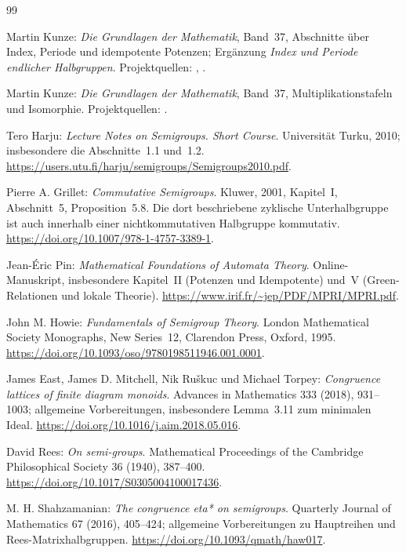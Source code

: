 \renewcommand{\bibname}{Quellen und Anschlüsse im Projekt}
\begin{thebibliography}{99}
\small
{}
Martin Kunze: \emph{Die Grundlagen der Mathematik}, Band~37,
Abschnitte über Index, Periode und idempotente Potenzen;
Ergänzung \emph{Index und Periode endlicher Halbgruppen}.
Projektquellen: ,
.

Martin Kunze: \emph{Die Grundlagen der Mathematik}, Band~37,
Multiplikationstafeln und Isomorphie.
Projektquellen: .

Tero Harju: \emph{Lecture Notes on Semigroups. Short Course}.
Universität Turku, 2010; insbesondere die Abschnitte~1.1 und~1.2.
\url{https://users.utu.fi/harju/semigroups/Semigroups2010.pdf}.

Pierre A. Grillet: \emph{Commutative Semigroups}.
Kluwer, 2001, Kapitel~I, Abschnitt~5, Proposition~5.8.
Die dort beschriebene zyklische Unterhalbgruppe ist auch innerhalb
einer nichtkommutativen Halbgruppe kommutativ.
\url{https://doi.org/10.1007/978-1-4757-3389-1}.

Jean-Éric Pin: \emph{Mathematical Foundations of Automata Theory}.
Online-Manuskript, insbesondere Kapitel~II (Potenzen und Idempotente)
und~V (Green-Relationen und lokale Theorie).
\url{https://www.irif.fr/~jep/PDF/MPRI/MPRI.pdf}.

John M. Howie: \emph{Fundamentals of Semigroup Theory}.
London Mathematical Society Monographs, New Series~12,
Clarendon Press, Oxford, 1995.
\url{https://doi.org/10.1093/oso/9780198511946.001.0001}.

James East, James D. Mitchell, Nik Ruškuc und Michael Torpey:
\emph{Congruence lattices of finite diagram monoids}.
Advances in Mathematics 333 (2018), 931--1003;
allgemeine Vorbereitungen, insbesondere Lemma~3.11 zum minimalen Ideal.
\url{https://doi.org/10.1016/j.aim.2018.05.016}.

David Rees: \emph{On semi-groups}.
Mathematical Proceedings of the Cambridge Philosophical Society
36 (1940), 387--400.
\url{https://doi.org/10.1017/S0305004100017436}.

M. H. Shahzamanian: \emph{The congruence eta* on semigroups}.
Quarterly Journal of Mathematics 67 (2016), 405--424;
allgemeine Vorbereitungen zu Hauptreihen und Rees-Matrixhalbgruppen.
\url{https://doi.org/10.1093/qmath/haw017}.


\end{thebibliography}
